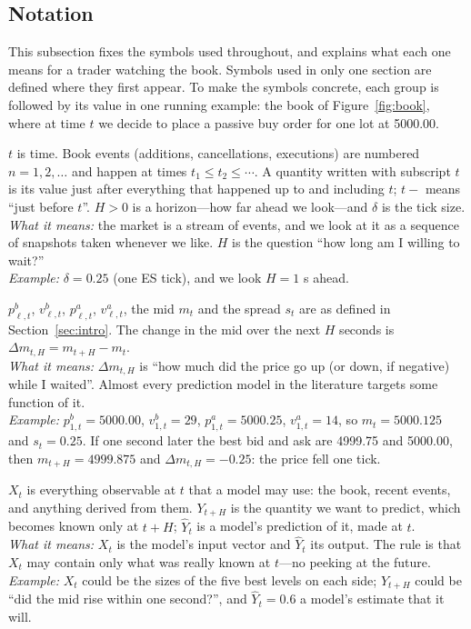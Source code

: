 \subsection{Notation}
\label{sec:notation}

This subsection fixes the symbols used throughout, and explains what each one means for a trader
watching the book. Symbols used in only one section are defined where they first appear. To make
the symbols concrete, each group is followed by its value in one running example: the book of
Figure~\ref{fig:book}, where at time $t$ we decide to place a passive buy order for one lot at
5000.00.

\begin{description}[leftmargin=1.5em,style=nextline,itemsep=4pt]
\item[Time and events]
  $t$ is time. Book events (additions, cancellations, executions) are numbered $n = 1, 2, \dots$
  and happen at times $t_1 \le t_2 \le \cdots$. A quantity written with subscript $t$ is its value
  just after everything that happened up to and including $t$; $t-$ means ``just before $t$''.
  $H > 0$ is a horizon---how far ahead we look---and $\delta$ is the tick size.\\
  \emph{What it means:} the market is a stream of events, and we look at it as a sequence of
  snapshots taken whenever we like. $H$ is the question ``how long am I willing to wait?''\\
  \emph{Example:} $\delta = 0.25$ (one ES tick), and we look $H = 1$ s ahead.

\item[Book]
  $p^{b}_{\ell,t}$, $v^{b}_{\ell,t}$, $p^{a}_{\ell,t}$, $v^{a}_{\ell,t}$, the mid $m_t$ and the
  spread $s_t$ are as defined in Section~\ref{sec:intro}. The change in the mid over the next $H$
  seconds is $\Delta m_{t,H} = m_{t+H} - m_t$.\\
  \emph{What it means:} $\Delta m_{t,H}$ is ``how much did the price go up (or down, if negative)
  while I waited''. Almost every prediction model in the literature targets some function of it.\\
  \emph{Example:} $p^b_{1,t} = 5000.00$, $v^b_{1,t} = 29$, $p^a_{1,t} = 5000.25$, $v^a_{1,t} = 14$,
  so $m_t = 5000.125$ and $s_t = 0.25$. If one second later the best bid and ask are 4999.75 and
  5000.00, then $m_{t+H} = 4999.875$ and $\Delta m_{t,H} = -0.25$: the price fell one tick.

\item[Information and prediction]
  $X_t$ is everything observable at $t$ that a model may use: the book, recent events, and anything
  derived from them. $Y_{t+H}$ is the quantity we want to predict, which becomes known only at
  $t+H$; $\widehat{Y}_t$ is a model's prediction of it, made at $t$.\\
  \emph{What it means:} $X_t$ is the model's input vector and $\widehat{Y}_t$ its output. The rule
  is that $X_t$ may contain only what was really known at $t$---no peeking at the future.\\
  \emph{Example:} $X_t$ could be the sizes of the five best levels on each side; $Y_{t+H}$ could be
  ``did the mid rise within one second?'', and $\widehat{Y}_t = 0.6$ a model's estimate that it
  will.


\end{description}
